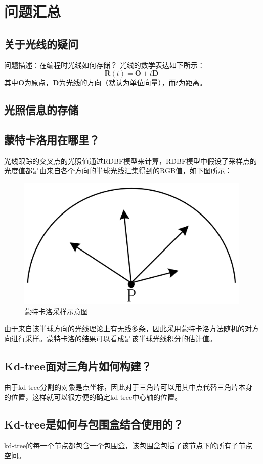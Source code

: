 \documentclass[10pt]{article}
\begin{document}
\section{问题汇总}
\subsection{关于光线的疑问}
问题描述：在编程时光线如何存储？
光线的数学表达如下所示：
$$\bm{R}(t)=\bm{O}+t\bm{D}$$
其中$\bm{O}$为原点，$\bm{D}$为光线的方向（默认为单位向量），而$t$为距离。
\subsection{光照信息的存储}

\subsection{蒙特卡洛用在哪里？}
光线跟踪的交叉点的光照值通过RDBF模型来计算，RDBF模型中假设了采样点的光度值都是由来自各个方向的半球光线汇集得到的RGB值，如下图所示：
\begin{figure}[H]
\begin{center}
\includegraphics[scale=0.25]{monte_carlo_sample.png}
\caption{蒙特卡洛采样示意图}
\end{center}
\end{figure}

由于来自该半球方向的光线理论上有无线多条，因此采用蒙特卡洛方法随机的对方向进行采样。蒙特卡洛的结果可以看成是该半球光线积分的估计值。
\subsection{Kd-tree面对三角片如何构建？}
由于kd-tree分割的对象是点坐标，因此对于三角片可以用其中点代替三角片本身的位置，这样就可以很方便的确定kd-tree中心轴的位置。
\subsection{Kd-tree是如何与包围盒结合使用的？}
kd-tree的每一个节点都包含一个包围盒，该包围盒包括了该节点下的所有子节点空间。
\end{document}

